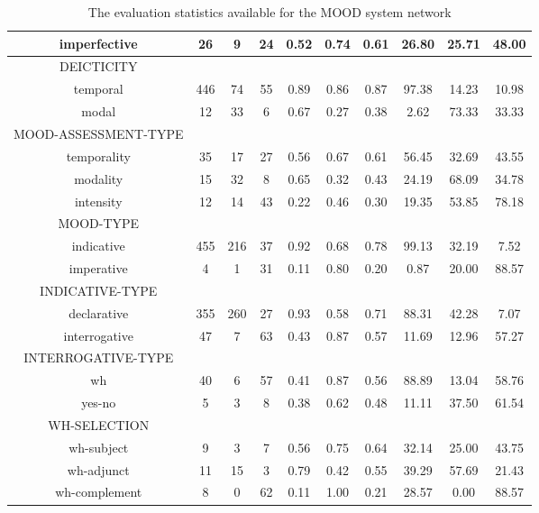 \begin{table}[!ht]
{\begin{tabular}{|c|c|c|c|c|c|c|c|c|c|}
                imperfective & 26  & 9  & 24  & 0.52 & 0.74 & 0.61 & 26.80 & 25.71 & 48.00 \\ \hline
                DEICTICITY &  &  &  &  &  &  &  &  &  \\ \hline            
                temporal & 446 & 74 & 55 & 0.89 & 0.86 & 0.87 & 97.38 & 14.23 & 10.98 \\ \hline
                modal    & 12  & 33 & 6  & 0.67 & 0.27 & 0.38 & 2.62  & 73.33 & 33.33 \\ \hline
                MOOD-ASSESSMENT-TYPE  &  &  &  &  &  &  &  &  &  \\ \hline            
                temporality & 35 & 17 & 27 & 0.56 & 0.67 & 0.61 & 56.45 & 32.69 & 43.55 \\ \hline
                modality    & 15 & 32 & 8  & 0.65 & 0.32 & 0.43 & 24.19 & 68.09 & 34.78 \\ \hline
                intensity   & 12 & 14 & 43 & 0.22 & 0.46 & 0.30 & 19.35 & 53.85 & 78.18 \\ \hline
                MOOD-TYPE  &  &  &  &  &  &  &  &  &  \\ \hline                        
                indicative    & 455 & 216 & 37 & 0.92 & 0.68 & 0.78 & 99.13 & 32.19 & 7.52  \\ \hline
                imperative    & 4   & 1   & 31 & 0.11 & 0.80 & 0.20 & 0.87  & 20.00 & 88.57 \\ \hline
                INDICATIVE-TYPE  &  &  &  &  &  &  &  &  &  \\ \hline                        
                declarative   & 355 & 260 & 27 & 0.93 & 0.58 & 0.71 & 88.31 & 42.28 & 7.07  \\ \hline
                interrogative & 47  & 7   & 63 & 0.43 & 0.87 & 0.57 & 11.69 & 12.96 & 57.27 \\ \hline
                INTERROGATIVE-TYPE  &  &  &  &  &  &  &  &  &  \\ \hline   
                 wh            & 40  & 6   & 57 & 0.41 & 0.87 & 0.56 & 88.89 & 13.04 & 58.76 \\ \hline
                yes-no        & 5   & 3   & 8  & 0.38 & 0.62 & 0.48 & 11.11 & 37.50 & 61.54 \\ \hline                     
                WH-SELECTION  &  &  &  &  &  &  &  &  &  \\ \hline                        
                wh-subject    & 9   & 3   & 7  & 0.56 & 0.75 & 0.64 & 32.14 & 25.00 & 43.75 \\ \hline
                wh-adjunct    & 11  & 15  & 3  & 0.79 & 0.42 & 0.55 & 39.29 & 57.69 & 21.43 \\ \hline
                wh-complement & 8   & 0   & 62 & 0.11 & 1.00 & 0.21 & 28.57 & 0.00  & 88.57 \\ \hline
            \end{tabular}
        }
        \caption{The evaluation statistics available for the MOOD system network}
        \label{tab:features-mood}
    \end{table}

